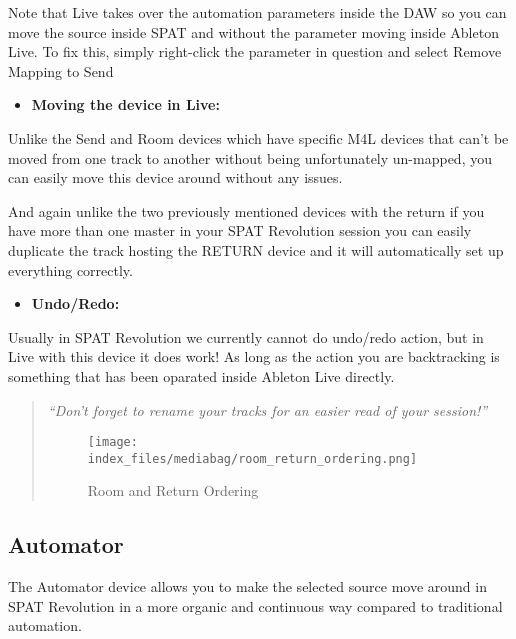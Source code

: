 \documentclass[
  letterpaper,
  DIV=11,
  numbers=noendperiod]{scrreport}
\providecommand{\tightlist}{%
  \setlength{\itemsep}{0pt}\setlength{\parskip}{0pt}}\usepackage{longtable,booktabs,array}
\begin{document}
Note that Live takes over the automation parameters inside the DAW so
you can move the source inside SPAT and without the parameter moving
inside Ableton Live. To fix this, simply right-click the parameter in
question and select Remove Mapping to Send

\begin{itemize}
\tightlist
\item
  \textbf{Moving the device in Live:}
\end{itemize}

Unlike the Send and Room devices which have specific M4L devices that
can't be moved from one track to another without being unfortunately
un-mapped, you can easily move this device around without any issues.

And again unlike the two previously mentioned devices with the return if
you have more than one master in your SPAT Revolution session you can
easily duplicate the track hosting the RETURN device and it will
automatically set up everything correctly.

\begin{itemize}
\tightlist
\item
  \textbf{Undo/Redo:}
\end{itemize}

Usually in SPAT Revolution we currently cannot do undo/redo action, but
in Live with this device it does work! As long as the action you are
backtracking is something that has been oparated inside Ableton Live
directly.

\begin{quote}
\emph{``Don't forget to rename your tracks for an easier read of your
session!''}

\begin{figure}

{\centering \texttt{[image: index\_files/mediabag/room\_return\_ordering.png]}

}

\caption{Room and Return Ordering}

\end{figure}
\end{quote}

\hypertarget{automator}{%
\subsection{Automator}\label{automator}}

The Automator device allows you to make the selected source move around
in SPAT Revolution in a more organic and continuous way compared to
traditional automation.
\end{document}
